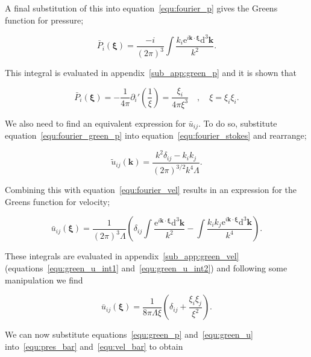 \documentclass[12pt]{article}
\begin{document}
A final substitution of this into equation~\ref{equ:fourier_p} gives the Greens function for pressure;

\begin{equation}
\label{equ:green_p_int}
\bar{P}_{i} (\boldsymbol\xi) = \frac{-i}{(2 \pi)^{3}} \int \frac{k_{i} \mathrm{e}^{i \boldsymbol{k} \cdot \boldsymbol{\xi}} \mathrm{d}^{3} \boldsymbol{k}}{k^{2}} .
\end{equation}

This integral is evaluated in appendix~\ref{sub_app:green_p} and it is shown that

\begin{equation}
\label{equ:green_p}
\bar{P}_{i} (\boldsymbol\xi) = -\frac{1}{4 \pi} \partial_{i}' \left(\frac{1}{\xi}\right) = \frac{\xi_{i}}{4 \pi \xi^{3}} \quad , \quad \xi = \xi_{i} \xi_{i} .
\end{equation}

We also need to find an equivalent expression for $\bar{u}_{ij}$. To do so, substitute equation~\ref{equ:fourier_green_p} into equation~\ref{equ:fourier_stokes} and rearrange;

\begin{equation}
\label{equ:fourier_green_u}
\tilde{u}_{ij} (\boldsymbol{k}) = \frac{k^{2} \delta_{ij} - k_{i} k_{j}}{(2 \pi)^{3/2} k^{4} \Lambda} .
\end{equation}

Combining this with equation~\ref{equ:fourier_vel} results in an expression for the Greens function for velocity;

\begin{equation}
\label{equ:green_u_int}
\bar{u}_{ij} (\boldsymbol\xi) = \frac{1}{(2 \pi)^{3} \Lambda} \left(\delta_{ij} \int \frac{\mathrm{e}^{i \boldsymbol{k} \cdot \boldsymbol\xi} \mathrm{d}^{3} \boldsymbol{k}}{k^{2}} - \int \frac{k_{i} k_{j} \mathrm{e}^{i \boldsymbol{k} \cdot \boldsymbol\xi} \mathrm{d}^{3} \boldsymbol{k}}{k^{4}} \right).
\end{equation}

These integrals are evaluated in appendix~\ref{sub_app:green_vel} (equations~\ref{equ:green_u_int1} and~\ref{equ:green_u_int2}) and following some manipulation we find

\begin{equation}
\label{equ:green_u}
\bar{u}_{ij} (\boldsymbol\xi) = \frac{1}{8 \pi \Lambda \xi} \left(\delta_{ij} + \frac{\xi_{i} \xi_{j}}{\xi^{2}} \right).
\end{equation}

We can now substitute equations~\ref{equ:green_p} and~\ref{equ:green_u} into~\ref{equ:pres_bar} and~\ref{equ:vel_bar} to obtain
\end{document}
